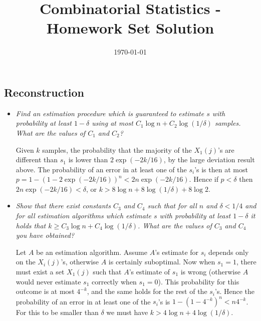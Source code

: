 \documentclass[11pt]{article} \usepackage{amssymb}
\begin{document}
\title{Combinatorial Statistics - Homework Set Solution}

\date{\today}
\maketitle
\subsection{Reconstruction}
\begin{itemize}
\item
{\em Find an estimation procedure which is guaranteed to estimate $s$ with probability at least $1-\delta$ using at most 
$C_1 \log n + C_2 \log (1/\delta)$ samples. What are the values of $C_1$ and $C_2$?  }

Given $k$ samples, the probability that the majority of  the $X_1(j)$'s are 
different than $s_1$
is lower than $2\exp(-2k/16)$, by the large deviation result above. 
The probability of an error in at least one of the $s_i$'s is then at most
$p=1-(1-2\exp(-2k/16))^n<2n\exp(-2k/16)$. Hence if 
$p<\delta$ then $2n\exp(-2k/16)<\delta$, or $k>8\log n+8\log(1/\delta)+8\log 2$.

\item
{\em Show that there exist constants $C_3$ and $C_4$ such that for all $n$ and $\delta < 1/4$ and for all estimation algorithms 
which estimate $s$ with probability at least $1-\delta$ it holds that $k \geq C_3 \log n + C_4 \log (1/\delta)$. 
What are the values of $C_3$ and $C_4$ you have obtained? }

Let $A$ be an estimation algorithm. Assume $A$'s estimate for $s_i$ depends
only on the $X_i(j)$'s, otherwise $A$ is certainly suboptimal. Now when
$s_1=1$, there must exist a set $X_1(j)$ such that $A$'s 
estimate of $s_1$ is wrong (otherwise $A$ would never estimate $s_1$ 
correctly when $s_1=0$). This probability for this outcome is at most $4^{-k}$,
and the same holds for the rest of the $s_i$'s. Hence the probability of an
error in at least one of the $s_i$'s is 
$1-\left(1-4^{-k}\right)^n<n4^{-k}$. For this to be smaller than $\delta$ we must have
$k>4\log n+4\log(1/\delta)$.

\end{itemize}
\end{document}
